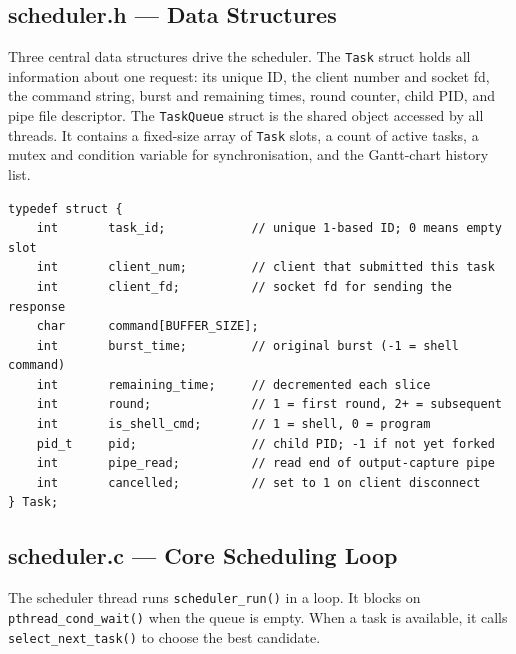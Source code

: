 \documentclass[12pt]{article}
\begin{document}
\subsection{scheduler.h --- Data Structures}

Three central data structures drive the scheduler. The \texttt{Task} struct holds all
information about one request: its unique ID, the client number and socket fd, the command
string, burst and remaining times, round counter, child PID, and pipe file descriptor.
The \texttt{TaskQueue} struct is the shared object accessed by all threads. It contains a
fixed-size array of \texttt{Task} slots, a count of active tasks, a mutex and condition
variable for synchronisation, and the Gantt-chart history list.

\begin{lstlisting}[caption={Key fields of the Task struct}]
typedef struct {
    int       task_id;            // unique 1-based ID; 0 means empty slot
    int       client_num;         // client that submitted this task
    int       client_fd;          // socket fd for sending the response
    char      command[BUFFER_SIZE];
    int       burst_time;         // original burst (-1 = shell command)
    int       remaining_time;     // decremented each slice
    int       round;              // 1 = first round, 2+ = subsequent
    int       is_shell_cmd;       // 1 = shell, 0 = program
    pid_t     pid;                // child PID; -1 if not yet forked
    int       pipe_read;          // read end of output-capture pipe
    int       cancelled;          // set to 1 on client disconnect
} Task;
\end{lstlisting}

\subsection{scheduler.c --- Core Scheduling Loop}

The scheduler thread runs \texttt{scheduler\_run()} in a loop. It blocks on
\texttt{pthread\_cond\_wait()} when the queue is empty. When a task is available, it
calls \texttt{select\_next\_task()} to choose the best candidate.
\end{document}
